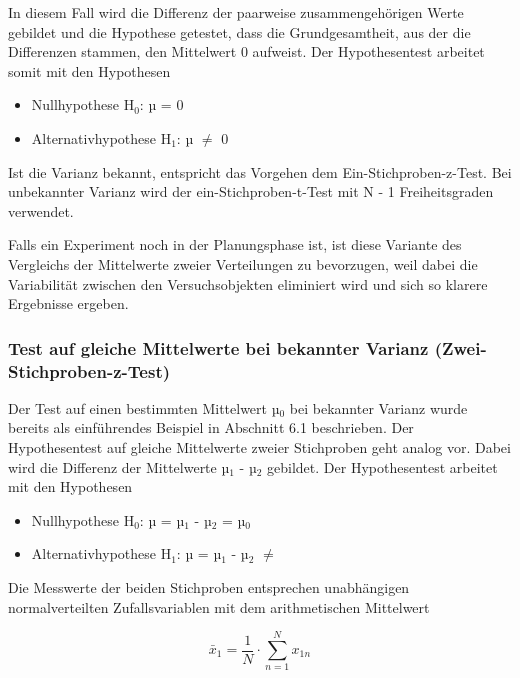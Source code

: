 \noindent In diesem Fall wird die Differenz der paarweise zusammengeh\"{o}rigen Werte gebildet und die Hypothese getestet, dass die Grundgesamtheit, aus der die Differenzen stammen, den Mittelwert 0 aufweist. Der Hypothesentest arbeitet somit mit den Hypothesen

\begin{itemize}
    \item Nullhypothese H$_{0}$: µ = 0
    \item  Alternativhypothese H$_{1}$: µ $\neq$ 0
\end{itemize}

\noindent Ist die Varianz bekannt, entspricht das Vorgehen dem Ein-Stichproben-z-Test. Bei unbekannter Varianz wird der ein-Stichproben-t-Test mit N - 1 Freiheitsgraden verwendet.\newline

\noindent Falls ein Experiment noch in der Planungsphase ist, ist diese Variante des Vergleichs der Mittelwerte zweier Verteilungen zu bevorzugen, weil dabei die Variabilit\"{a}t zwischen den Versuchsobjekten eliminiert wird und sich so klarere Ergebnisse ergeben.

\subsubsection{Test auf gleiche Mittelwerte bei bekannter Varianz (Zwei-Stichproben-z-Test)}

\noindent Der Test auf einen bestimmten Mittelwert µ$_{0}$ bei bekannter Varianz wurde bereits als einf\"{u}hrendes Beispiel in Abschnitt 6.1 beschrieben. Der Hypothesentest auf gleiche Mittelwerte zweier Stichproben geht analog vor. Dabei wird die Differenz der Mittelwerte µ$_{1}$ - µ$_{2}$ gebildet. Der Hypothesentest arbeitet mit den Hypothesen

\begin{itemize}
    \item Nullhypothese H$_{0}$: µ = µ$_{1}$ - µ$_{2}$ = µ$_{0}$
    \item Alternativhypothese H$_{1}$: µ = µ$_{1}$ - µ$_{2}$ $\neq$
\end{itemize}

\noindent Die Messwerte der beiden Stichproben entsprechen unabh\"{a}ngigen normalverteilten Zufallsvariablen mit dem arithmetischen Mittelwert

\begin{equation}\label{eq:sixonehundredtwo}
\bar{x}_{1} =\dfrac{1}{N} \cdot \sum _{n=1}^{N}x_{1n}
\end{equation}


